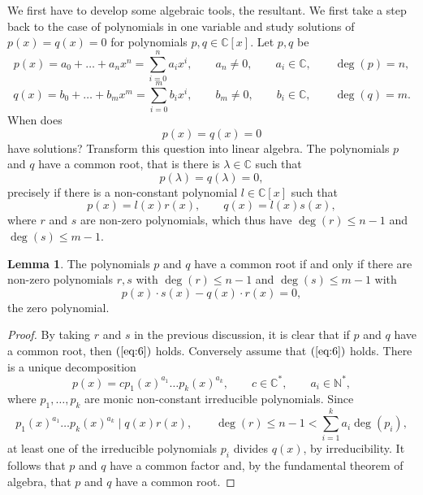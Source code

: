 \documentclass{article}
\newcommand{\N}{\mathbb{N}}
\newcommand{\C}{\mathbb{C}}
\newcommand{\rb}[1]{\left( #1 \right)}
\renewcommand{\sb}[1]{\left[ #1 \right]}
\theoremstyle{definition}\newtheorem{definition}{Definition}[section]
\theoremstyle{definition}\newtheorem{notation}[definition]{Notation}
\theoremstyle{definition}\newtheorem{remark}[definition]{Remark}
\theoremstyle{definition}\newtheorem{example1}[definition]{Example}
\theoremstyle{definition}\newtheorem{fact}{Fact}
\theoremstyle{definition}\newtheorem{exercise}{Exercise}
\theoremstyle{definition}\newtheorem*{example2}{Example}
\newtheorem{lemma}[definition]{Lemma}
\begin{document}
We first have to develop some algebraic tools, the resultant. We first take a step back to the case of polynomials in one variable and study solutions of $ p\rb{x} = q\rb{x} = 0 $ for polynomials $ p, q \in \C\sb{x} $. Let $ p, q $ be
$$ p\rb{x} = a_0 + \dots + a_nx^n = \sum_{i = 0}^n a_ix^i, \qquad a_n \ne 0, \qquad a_i \in \C, \qquad \deg\rb{p} = n, $$
$$ q\rb{x} = b_0 + \dots + b_mx^m = \sum_{i = 0}^m b_ix^i, \qquad b_m \ne 0, \qquad b_i \in \C, \qquad \deg\rb{q} = m. $$
When does
$$ p\rb{x} = q\rb{x} = 0 $$
have solutions? Transform this question into linear algebra. The polynomials $ p $ and $ q $ have a common root, that is there is $ \lambda \in \C $ such that
$$ p\rb{\lambda} = q\rb{\lambda} = 0, $$
precisely if there is a non-constant polynomial $ l \in \C\sb{x} $ such that
$$ p\rb{x} = l\rb{x}r\rb{x}, \qquad q\rb{x} = l\rb{x}s\rb{x}, $$
where $ r $ and $ s $ are non-zero polynomials, which thus have $ \deg\rb{r} \le n - 1 $ and $ \deg\rb{s} \le m - 1 $.

\begin{lemma}
\label{lem:9.1}
The polynomials $ p $ and $ q $ have a common root if and only if there are non-zero polynomials $ r, s $ with $ \deg\rb{r} \le n - 1 $ and $ \deg\rb{s} \le m - 1 $ with
\begin{equation}
\label{eq:6}
p\rb{x} \cdot s\rb{x} - q\rb{x} \cdot r\rb{x} = 0,
\end{equation}
the zero polynomial.
\end{lemma}

\begin{proof}
By taking $ r $ and $ s $ in the previous discussion, it is clear that if $ p $ and $ q $ have a common root, then $ \rb{\ref{eq:6}} $ holds. Conversely assume that $ \rb{\ref{eq:6}} $ holds. There is a unique decomposition
$$ p\rb{x} = cp_1\rb{x}^{a_1} \dots p_k\rb{x}^{a_k}, \qquad c \in \C^*, \qquad a_i \in \N^*, $$
where $ p_1, \dots, p_k $ are monic non-constant irreducible polynomials. Since
$$ p_1\rb{x}^{a_1} \dots p_k\rb{x}^{a_k} \mid q\rb{x}r\rb{x}, \qquad \deg\rb{r} \le n - 1 < \sum_{i = 1}^k a_i \deg\rb{p_i}, $$
at least one of the irreducible polynomials $ p_i $ divides $ q\rb{x} $, by irreducibility. It follows that $ p $ and $ q $ have a common factor and, by the fundamental theorem of algebra, that $ p $ and $ q $ have a common root.
\end{proof}
\end{document}

